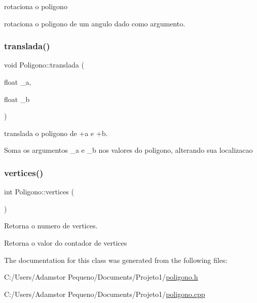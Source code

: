 rotaciona o poligono 

rotaciona o poligono de um angulo dado como argumento. \mbox{\label{class_poligono_aafacd43b0918e0765fbb42d9aad5bb35}} 
\subsubsection{\texorpdfstring{translada()}{translada()}}
{\footnotesize\ttfamily void Poligono\+::translada (\begin{DoxyParamCaption}\item[{float}]{\+\_\+a,  }\item[{float}]{\+\_\+b }\end{DoxyParamCaption})}



translada o poligono de +a e +b. 

Soma os argumentos \+\_\+a e \+\_\+b nos valores do poligono, alterando sua localizacao \mbox{\label{class_poligono_a0e4a1dda914bb96506976c0ff2f17f23}} 
\subsubsection{\texorpdfstring{vertices()}{vertices()}}
{\footnotesize\ttfamily int Poligono\+::vertices (\begin{DoxyParamCaption}{ }\end{DoxyParamCaption})}



Retorna o numero de vertices. 

Retorna o valor do contador de vertices 

The documentation for this class was generated from the following files\+:\begin{DoxyCompactItemize}
\item 
C\+:/\+Users/\+Adamstor Pequeno/\+Documents/\+Projeto1/\mbox{\hyperlink{poligono_8h}{poligono.\+h}}\item 
C\+:/\+Users/\+Adamstor Pequeno/\+Documents/\+Projeto1/\mbox{\hyperlink{poligono_8cpp}{poligono.\+cpp}}\end{DoxyCompactItemize}

